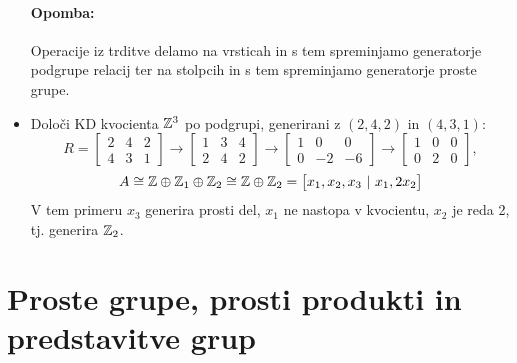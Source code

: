 \begin{itemize}
{		\paragraph{Opomba:} Operacije iz trditve delamo na vrsticah in s tem spreminjamo generatorje podgrupe relacij
		ter na stolpcih in s tem spreminjamo generatorje proste grupe.
	}
	\item{Dolo\v ci KD kvocienta $\mathbb{Z}^3$ po podgrupi, generirani z $(2,4,2)$ in $(4,3,1)$:
		\[
			R = \begin{bmatrix}
				2 & 4 & 2 \\
				4 & 3 & 1
			\end{bmatrix} \to \begin{bmatrix}
				1 & 3 & 4 \\
				2 & 4 & 2
			\end{bmatrix} \to \begin{bmatrix}
				1 & 0 & 0 \\
				0 & -2 & -6
			\end{bmatrix} \to \begin{bmatrix}
				1 & 0 & 0 \\
				0 & 2 & 0
			\end{bmatrix},
		\]
		\[
			A \cong \mathbb{Z} \oplus \mathbb{Z}_1 \oplus \mathbb{Z}_2 \cong \mathbb{Z} \oplus \mathbb{Z}_2 = \big[x_1, x_2, x_3\ |\ x_1, 2x_2\big]
		\]
		V tem primeru $x_3$ generira prosti del, $x_1$ ne nastopa v kvocientu, $x_2$ je reda 2, tj. generira $\mathbb{Z}_2$.
	}
\end{itemize}

\section{Proste grupe, prosti produkti in predstavitve grup}

